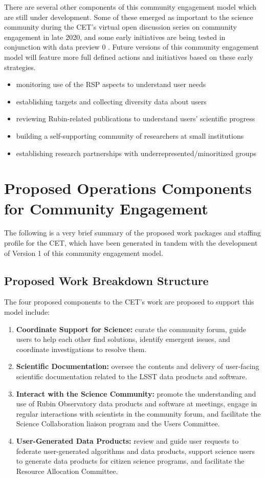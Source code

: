 \documentclass[DM,lsstdraft,toc]{lsstdoc}
\begin{document}
There are several other components of this community engagement model which are still under development.
Some of these emerged as important to the science community during the CET's virtual open discussion series on community engagement in late 2020, and some early initiatives are being tested in conjunction with data preview 0 .
Future versions of this community engagement model will feature more full defined actions and initiatives based on these early strategies.
\begin{itemize}
\item monitoring use of the RSP aspects to understand user needs
\item establishing targets and collecting diversity data about users
\item reviewing Rubin-related publications to understand users' scientific progress
\item building a self-supporting community of researchers at small institutions
\item establishing research partnerships with underrepresented/minoritized groups
\end{itemize}


\section{Proposed Operations Components for Community Engagement}

The following is a very brief summary of the proposed work packages and staffing profile for the CET, which have been generated in tandem with the development of Version 1 of this community engagement model.


\subsection{Proposed Work Breakdown Structure}

The four proposed components to the CET's work are proposed to support this model include:
\begin{enumerate}
\item \textbf{Coordinate Support for Science:} curate the community forum, guide users to help each other find solutions, identify emergent issues, and coordinate investigations to resolve them.
\item \textbf{Scientific Documentation:} oversee the contents and delivery of user-facing scientific documentation related to the LSST data products and software. 
\item \textbf{Interact with the Science Community:} promote the understanding and use of Rubin Observatory data products and software at meetings, engage in regular interactions with scientists in the community forum, and facilitate the Science Collaboration liaison program and the Users Committee.
\item \textbf{User-Generated Data Products:} review and guide user requests to federate user-generated algorithms and data products, support science users to generate data products for citizen science programs, and facilitate the Resource Allocation Committee.
\end{enumerate}
\end{document}
